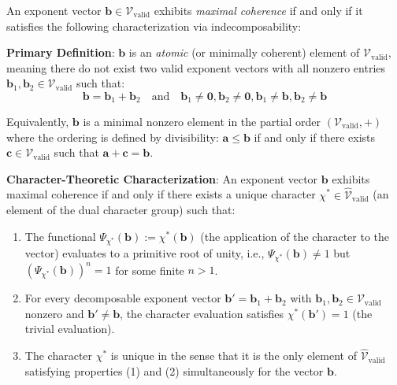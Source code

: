 \begin{definition}
\label{def:maximal-coherence}

An exponent vector $\mathbf{b} \in \mathcal{V}_{\text{valid}}$ exhibits \emph{maximal coherence} if and only if it satisfies the following characterization via indecomposability:

\noindent \textbf{Primary Definition}: $\mathbf{b}$ is an \emph{atomic} (or minimally coherent) element of $\mathcal{V}_{\text{valid}}$, meaning there do not exist two valid exponent vectors with all nonzero entries $\mathbf{b}_1, \mathbf{b}_2 \in \mathcal{V}_{\text{valid}}$ such that:
\begin{equation}
\mathbf{b} = \mathbf{b}_1 + \mathbf{b}_2 \quad \text{and} \quad \mathbf{b}_1 \neq \mathbf{0}, \mathbf{b}_2 \neq \mathbf{0}, \mathbf{b}_1 \neq \mathbf{b}, \mathbf{b}_2 \neq \mathbf{b}
\end{equation}

Equivalently, $\mathbf{b}$ is a minimal nonzero element in the partial order $(\mathcal{V}_{\text{valid}}, +)$ where the ordering is defined by divisibility: $\mathbf{a} \leq \mathbf{b}$ if and only if there exists $\mathbf{c} \in \mathcal{V}_{\text{valid}}$ such that $\mathbf{a} + \mathbf{c} = \mathbf{b}$.

\noindent \textbf{Character-Theoretic Characterization}: An exponent vector $\mathbf{b}$ exhibits maximal coherence if and only if there exists a unique character $\chi^* \in \hat{\mathcal{V}}_{\text{valid}}$ (an element of the dual character group) such that:
\begin{enumerate}
\item The functional $\Psi_{\chi^*}(\mathbf{b}) := \chi^*(\mathbf{b})$ (the application of the character to the vector) evaluates to a primitive root of unity, i.e., $\Psi_{\chi^*}(\mathbf{b}) \neq 1$ but $(\Psi_{\chi^*}(\mathbf{b}))^n = 1$ for some finite $n > 1$.
\item For every decomposable exponent vector $\mathbf{b}' = \mathbf{b}_1 + \mathbf{b}_2$ with $\mathbf{b}_1, \mathbf{b}_2 \in \mathcal{V}_{\text{valid}}$ nonzero and $\mathbf{b}' \neq \mathbf{b}$, the character evaluation satisfies $\chi^*(\mathbf{b}') = 1$ (the trivial evaluation).
\item The character $\chi^*$ is unique in the sense that it is the only element of $\hat{\mathcal{V}}_{\text{valid}}$ satisfying properties (1) and (2) simultaneously for the vector $\mathbf{b}$.
\end{enumerate}


\end{definition}
